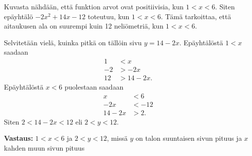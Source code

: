 \begin{esimerkki}
Kuvasta nähdään, että funktion arvot ovat positiivisia, kun $1<x<6$. Siten
epäyhtälö $-2x^2+14x-12$ toteutuu, kun $1<x<6$. Tämä tarkoittaa, että aitaukusen ala on suurempi kuin 12 neliömetriä, kun $1<x<6$.

Selvitetään vielä, kuinka pitkä on tällöin sivu $y=14-2x$. Epäyhtälöstä $1<x$ saadaan
\begin{align*}
1&<x \\
-2&>-2x \\
12&>14-2x.
\end{align*}
Epäyhtälöstä $x<6$ puolestaan saadaan
\begin{align*}
x&<6 \\
-2x&<-12 \\
14-2x&>2.
\end{align*}
Siten $2<14-2x<12$ eli $2<y<12$.

\textbf{Vastaus:} $1<x<6$ ja $2<y<12$, missä $y$ on talon suuntaisen sivun pituus ja $x$ kahden muun sivun pituus
\end{esimerkki}

